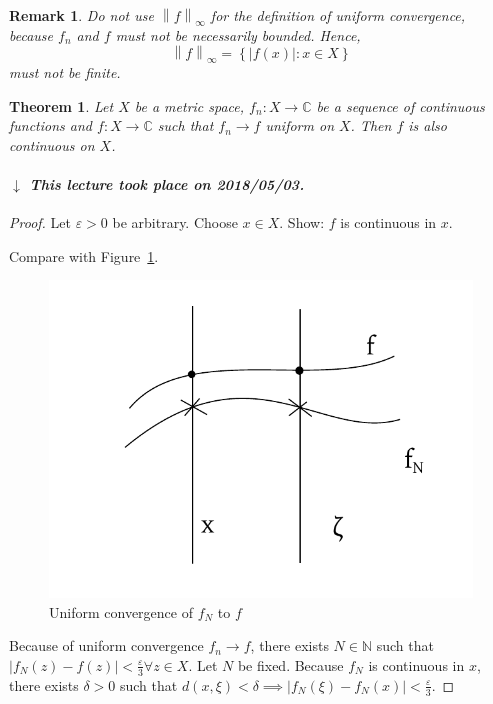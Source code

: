 \documentclass{article}
\newtheorem{theorem}{Theorem}  \numberwithin{theorem}{section}
\newtheorem{remark}{Remark}  \numberwithin{remark}{section}
\newcommand{\set}[1]{\left\{#1\right\}}
\newcommand{\norm}[1]{\left\|#1\right\|}
\newcommand{\card}[1]{\left|#1\right|}
\newcommand{\dateref}[1]{%
  \begin{mdframed}[backgroundcolor=gray!10,innerbottommargin=0pt,innertopmargin=0pt]
    \paragraph{\textit{$\downarrow$ This lecture took place on #1.}}%
  \end{mdframed}%
}
\begin{document}
\begin{remark}
  Do not use $\norm{f}_{\infty}$ for the definition of uniform convergence,
  because $f_n$ and $f$ must not be necessarily bounded. Hence,
  \[ \norm{f}_\infty = \set{\card{f(x)}: x \in X} \]
  must not be finite.
\end{remark}

\begin{theorem} %
  \label{satz1cont}
  Let $X$ be a metric space, $f_n: X \to \mathbb C$ be a sequence of continuous functions and $f: X \to \mathbb C$ such that
  $f_n \to f$ uniform on $X$. Then $f$ is also continuous on $X$.
\end{theorem}

\dateref{2018/05/03}

\begin{proof}
  Let $\varepsilon > 0$ be arbitrary.
  Choose $x \in X$. Show: $f$ is continuous in $x$.

  Compare with Figure~\ref{img:uniconv}.

  \begin{figure}[t]
    \begin{center}
      \includegraphics{img/25_uniform_convergence_of_fN_to_f.pdf}
      \caption{Uniform convergence of $f_N$ to $f$}
      \label{img:uniconv}
    \end{center}
  \end{figure}

  Because of uniform convergence $f_n \to f$, there exists $N \in \mathbb N$ such that $\card{f_N(z) - f(z)} < \frac\varepsilon3 \forall z \in X$.
  Let $N$ be fixed. Because $f_N$ is continuous in $x$, there exists $\delta > 0$ such that $d(x, \xi) < \delta \implies \card{f_N(\xi) - f_N(x)} < \frac\varepsilon3$.


\end{proof}
\end{document}
